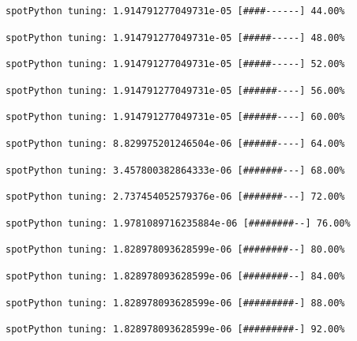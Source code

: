 \documentclass[
  letterpaper,
  DIV=11,
  numbers=noendperiod]{scrreprt}
\begin{document}
\begin{verbatim}
spotPython tuning: 1.914791277049731e-05 [####------] 44.00% 
\end{verbatim}

\begin{verbatim}
spotPython tuning: 1.914791277049731e-05 [#####-----] 48.00% 
\end{verbatim}

\begin{verbatim}
spotPython tuning: 1.914791277049731e-05 [#####-----] 52.00% 
\end{verbatim}

\begin{verbatim}
spotPython tuning: 1.914791277049731e-05 [######----] 56.00% 
\end{verbatim}

\begin{verbatim}
spotPython tuning: 1.914791277049731e-05 [######----] 60.00% 
\end{verbatim}

\begin{verbatim}
spotPython tuning: 8.829975201246504e-06 [######----] 64.00% 
\end{verbatim}

\begin{verbatim}
spotPython tuning: 3.457800382864333e-06 [#######---] 68.00% 
\end{verbatim}

\begin{verbatim}
spotPython tuning: 2.737454052579376e-06 [#######---] 72.00% 
\end{verbatim}

\begin{verbatim}
spotPython tuning: 1.9781089716235884e-06 [########--] 76.00% 
\end{verbatim}

\begin{verbatim}
spotPython tuning: 1.828978093628599e-06 [########--] 80.00% 
\end{verbatim}

\begin{verbatim}
spotPython tuning: 1.828978093628599e-06 [########--] 84.00% 
\end{verbatim}

\begin{verbatim}
spotPython tuning: 1.828978093628599e-06 [#########-] 88.00% 
\end{verbatim}

\begin{verbatim}
spotPython tuning: 1.828978093628599e-06 [#########-] 92.00% 
\end{verbatim}
\end{document}
